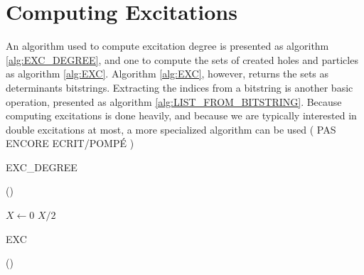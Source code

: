 \documentclass[./thesis.tex]{subfiles}
\begin{document}
\section{Computing Excitations}

An algorithm used to compute excitation degree is presented as algorithm \ref{alg:EXC_DEGREE}, and one to compute the sets of created holes and particles as algorithm \ref{alg:EXC}. Algorithm \ref{alg:EXC}, however, returns the sets as determinants bitstrings. Extracting the indices from a bitstring is another basic operation, presented as algorithm \ref{alg:LIST_FROM_BITSTRING}.
Because computing excitations is done heavily, and because we are typically interested in double excitations at most, a more specialized algorithm can be used ( PAS ENCORE ECRIT/POMPÉ )


\begin{algorithm}[h!]
	\caption{EXC\_DEGREE}
	\label{alg:EXC_DEGREE}
	
	\Fn(){}{

		$X \gets 0$   \;
		\KwRet $X / 2$\;
	}
\end{algorithm}


\begin{algorithm}[H]
	\caption{EXC}
		
	\label{alg:EXC}
	
	\Fn(){}{
		\;
		}
\end{algorithm}
\end{document}
